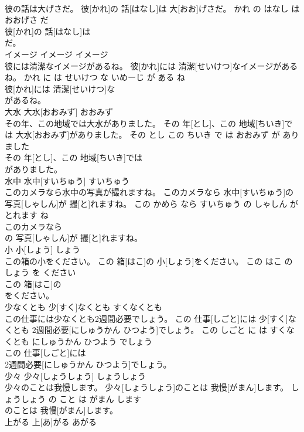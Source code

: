 \documentclass[8pt]{extreport}
\begin{document}
\begin{CJK}{UTF8}{min}
\\	彼の話は大げさだ。	彼[かれ]の 話[はなし]は 大[おお]げさだ。	かれ の はなし は おおげさ だ	
\\	彼[かれ]の 話[はなし]は
\\	だ。			
\\	イメージ	イメージ	イメージ	
\\	彼には清潔なイメージがあるね。	彼[かれ]には 清潔[せいけつ]なイメージがあるね。	かれ に は せいけつ な いめーじ が ある ね	
\\	彼[かれ]には 清潔[せいけつ]な
\\	があるね。			
\\	大水	大水[おおみず]	おおみず	
\\	その年、この地域では大水がありました。	その 年[とし]、この 地域[ちいき]では 大水[おおみず]がありました。	その とし この ちいき で は おおみず が ありました	
\\	その 年[とし]、この 地域[ちいき]では
\\	がありました。			
\\	水中	水中[すいちゅう]	すいちゅう	
\\	このカメラなら水中の写真が撮れますね。	このカメラなら 水中[すいちゅう]の 写真[しゃしん]が 撮[と]れますね。	この かめら なら すいちゅう の しゃしん が とれます ね	
\\	このカメラなら
\\	の 写真[しゃしん]が 撮[と]れますね。			
\\	小	小[しょう]	しょう	
\\	この箱の小をください。	この 箱[はこ]の 小[しょう]をください。	この はこ の しょう を ください	
\\	この 箱[はこ]の
\\	をください。			
\\	少なくとも	少[すく]なくとも	すくなくとも	
\\	この仕事には少なくとも2週間必要でしょう。	この 仕事[しごと]には 少[すく]なくとも 2週間必要[にしゅうかん ひつよう]でしょう。	この しごと に は すくなくとも にしゅうかん ひつよう でしょう	
\\	この 仕事[しごと]には
\\	2週間必要[にしゅうかん ひつよう]でしょう。			
\\	少々	少々[しょうしょう]	しょうしょう	
\\	少々のことは我慢します。	少々[しょうしょう]のことは 我慢[がまん]します。	しょうしょう の こと は がまん します	
\\	のことは 我慢[がまん]します。			
\\	上がる	上[あ]がる	あがる	

\end{CJK}
\end{document}
